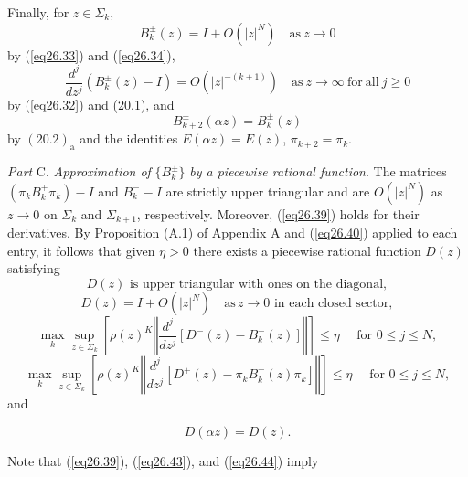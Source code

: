\documentclass{surv-l}
\theoremstyle{plain}
\theoremstyle{definition}
\numberwithin{equation}{chapter}
\begin{document}
Finally, for $z\in\Sigma_{k}$,
\begin{equation}\label{eq26.38}
B_{k}^{\pm}(z)=I+O(|z|^{N})\quad \mathrm{as}\ z\rightarrow 0
\end{equation}
by (\ref{eq26.33}) and (\ref{eq26.34}),
\begin{equation}\label{eq26.39}
\frac{d^{j}}{dz^{j}}(B_{k}^{\pm}(z)-I)=O(|z|^{-(k+1)})\quad \mathrm{as}\  z\rightarrow\infty\ \mathrm{for}\ \mathrm{all}\ j\geq 0
\end{equation}
by (\ref{eq26.32}) and (20.1), and
\begin{equation}\label{eq26.40}
B_{k+2}^{\pm}(\alpha z)=B_{k}^{\pm}(z)
\end{equation}
by $(20.2)_{\mathrm{a}}$ and the identities $E(\alpha z)=E(z)$, $\pi_{k+2}=\pi_{k}$.

\emph{Part} C. \emph{Approximation of} $\{B_{k}^{\pm}\}$ \emph{by a piecewise rational function}. The matrices $(\pi_{k}B_{k}^{+}\pi_{k})-I$ and $B_{k}^{-}-I$ are strictly upper triangular and are $O(|z|^{N})$ as $z\rightarrow 0$ on $\Sigma_{k}$ and $\Sigma_{k+1}$, respectively. Moreover, (\ref{eq26.39}) holds for their derivatives. By Proposition (A.1) of Appendix A and (\ref{eq26.40}) applied to each entry, it follows that given $\eta>0$ there exists a piecewise rational function $D(z)$ satisfying
\begin{equation}\label{eq26.41}
D(z)\text{ is upper triangular with ones on the diagonal},
\end{equation}
\begin{equation}\label{eq26.42}
D(z)=I+O(|z|^{N})\quad \mathrm{as}\, z\rightarrow 0\text{ in each closed sector},
\end{equation}
\begin{equation}\label{eq26.43}
\displaystyle \max_{k}\sup_{z\in\Sigma_{k}}\left[\rho(z)^{K}\left\Vert\frac{d^{j}}{dz^{{j}}}[D^{-}(z)-B_{k}^{-}(z)]\right\Vert\right]\leq\eta\quad \text{ for } 0\leq j\leq N,
\end{equation}
\begin{equation}\label{eq26.44}
\displaystyle \max_{k}\sup_{z\in\Sigma_{k}}\left[\rho(z)^{K}\left\Vert\frac{d^{j}}{dz^{{j}}}[D^{+}(z) -\pi_{k}B_{k}^{+}(z)\pi_{k}]\right\Vert\right]\leq\eta \quad\text{ for } 0\leq j\leq N,
\end{equation}
and

\begin{equation}\label{eq26.45}
D(\alpha z)=D(z).
\end{equation}

Note that (\ref{eq26.39}), (\ref{eq26.43}), and (\ref{eq26.44}) imply
\end{document}
